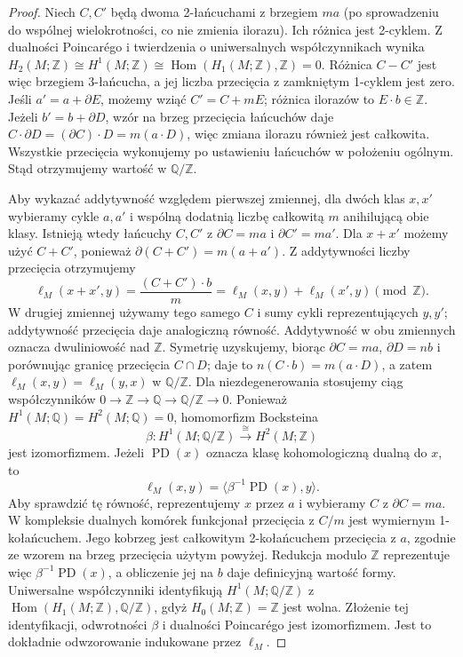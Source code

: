 \begin{proof}
Niech $C,C'$ będą dwoma 2-łańcuchami z brzegiem
$m a$ (po sprowadzeniu do wspólnej wielokrotności,
co nie zmienia ilorazu). Ich różnica jest 2-cyklem.
Z dualności Poincarégo i twierdzenia o uniwersalnych
współczynnikach wynika
$H_2(M;\mathbb Z)\cong H^1(M;\mathbb Z)
\cong\operatorname{Hom}(H_1(M;\mathbb Z),\mathbb Z)=0$.
Różnica $C-C'$ jest więc brzegiem 3-łańcucha,
a jej liczba przecięcia z zamkniętym 1-cyklem
jest zero. Jeśli $a'=a+\partial E$, możemy wziąć
$C'=C+mE$; różnica ilorazów to $E\cdot b\in\mathbb Z$.
Jeżeli $b'=b+\partial D$, wzór na brzeg przecięcia
łańcuchów daje $C\cdot\partial D=(\partial C)\cdot D
=m(a\cdot D)$, więc zmiana ilorazu również jest całkowita.
Wszystkie przecięcia wykonujemy po ustawieniu
łańcuchów w położeniu ogólnym. Stąd otrzymujemy
wartość w $\mathbb Q/\mathbb Z$.

Aby wykazać addytywność względem pierwszej zmiennej,
dla dwóch klas $x,x'$ wybieramy cykle $a,a'$
i wspólną dodatnią liczbę całkowitą $m$ anihilującą
obie klasy. Istnieją wtedy łańcuchy $C,C'$ z
$\partial C=ma$ i $\partial C'=ma'$.
Dla $x+x'$ możemy użyć $C+C'$, ponieważ
$\partial(C+C')=m(a+a')$. Z addytywności liczby
przecięcia otrzymujemy
\[
\ell_M(x+x',y)
=\frac{(C+C')\cdot b}{m}
=\ell_M(x,y)+\ell_M(x',y)\pmod{\mathbb Z}.
\]
W drugiej zmiennej używamy tego samego $C$
i sumy cykli reprezentujących $y,y'$; addytywność
przecięcia daje analogiczną równość.
Addytywność w obu zmiennych oznacza
dwuliniowość nad $\mathbb Z$.
Symetrię uzyskujemy, biorąc $\partial C=ma$,
$\partial D=nb$ i porównując granicę przecięcia
$C\cap D$; daje to $n(C\cdot b)=m(a\cdot D)$,
a zatem $\ell_M(x,y)=\ell_M(y,x)$ w $\mathbb Q/\mathbb Z$.
Dla niezdegenerowania stosujemy ciąg współczynników
$0\to\mathbb Z\to\mathbb Q\to\mathbb Q/\mathbb Z\to0$.
Ponieważ $H^1(M;\mathbb Q)=H^2(M;\mathbb Q)=0$,
homomorfizm Bocksteina
\[
\beta:H^1(M;\mathbb Q/\mathbb Z)
\xrightarrow{\ \cong\ }H^2(M;\mathbb Z)
\]
jest izomorfizmem. Jeżeli $\operatorname{PD}(x)$
oznacza klasę kohomologiczną dualną do $x$, to
\[
\ell_M(x,y)=\langle\beta^{-1}\operatorname{PD}(x),y\rangle .
\]
Aby sprawdzić tę równość, reprezentujemy $x$ przez
$a$ i wybieramy $C$ z $\partial C=ma$. W kompleksie
dualnych komórek funkcjonał przecięcia z $C/m$
jest wymiernym 1-kołańcuchem. Jego kobrzeg jest
całkowitym 2-kołańcuchem przecięcia z $a$, zgodnie
ze wzorem na brzeg przecięcia użytym powyżej.
Redukcja modulo $\mathbb Z$ reprezentuje więc
$\beta^{-1}\operatorname{PD}(x)$, a obliczenie jej
na $b$ daje definicyjną wartość formy.
Uniwersalne współczynniki identyfikują
$H^1(M;\mathbb Q/\mathbb Z)$ z
$\operatorname{Hom}(H_1(M;\mathbb Z),\mathbb Q/\mathbb Z)$,
gdyż $H_0(M;\mathbb Z)=\mathbb Z$ jest wolna.
Złożenie tej identyfikacji, odwrotności $\beta$
i dualności Poincarégo jest izomorfizmem.
Jest to dokładnie odwzorowanie indukowane przez
$\ell_M$.
\end{proof}

